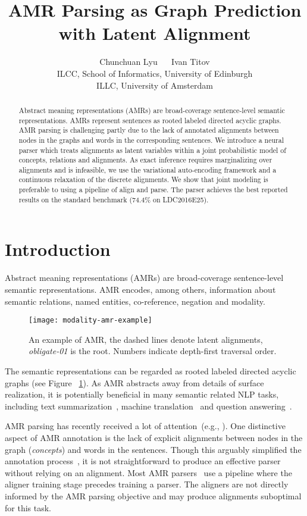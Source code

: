 \documentclass[11pt,a4paper]{article}
\title{AMR Parsing as Graph Prediction with Latent Alignment}
\author{
Chunchuan Lyu ~~  Ivan Titov \\
ILCC, School of Informatics, University of Edinburgh \\
ILLC, University of Amsterdam \\ 
}
\date{}
\begin{document}
\maketitle
\begin{abstract}
Abstract meaning representations (AMRs) are broad-coverage sentence-level semantic representations. AMRs represent sentences as rooted labeled directed acyclic graphs. AMR parsing is challenging partly due to the lack of annotated alignments between
nodes in the graphs and words in the corresponding sentences.
We introduce a neural parser which treats alignments as latent variables within a joint probabilistic model of concepts, relations and alignments. 
As exact inference requires marginalizing over alignments and 
is infeasible, we use the variational auto-encoding framework and a continuous relaxation of the discrete alignments.
We show that joint modeling 
is preferable to using a pipeline of align and parse. 
The parser achieves the best reported results on the standard benchmark (74.4\% on LDC2016E25). 


\end{abstract}


\section{Introduction}

Abstract meaning representations (AMRs) \cite{Banarescu13abstractmeaning} are broad-coverage sentence-level semantic representations. 
AMR encodes, among others, information about semantic relations, named entities, co-reference, negation and modality.
\begin{figure}[ht!]
\centering
\texttt{[image: modality-amr-example]}
\vspace{-2ex}
\caption{An example of AMR, the dashed lines denote latent alignments, {\it obligate-01} is the root. Numbers indicate depth-first traversal order.}
\label{fig:amr-example}
\end{figure}
The semantic representations can be regarded as rooted labeled directed acyclic graphs (see Figure ~\ref{fig:amr-example}). As AMR abstracts away from details of surface realization, it is potentially beneficial in many semantic related NLP tasks, including text summarization~\cite{Liu2015TowardAS,dohare2017text}, machine translation~\cite{Jones2012SemanticsBasedMT} and question answering~\cite{AAAI1612345}. 

AMR parsing has recently received a lot of attention~(e.g., \cite{Flanigan_adiscriminative,Artzi2015BroadcoverageCS,konstas-EtAl:2017:Long}). One distinctive aspect of AMR annotation is the lack of explicit alignments between nodes in the graph ({\it concepts}) and words in the sentences. Though this arguably simplified the annotation process~\cite{Banarescu13abstractmeaning}, it is not straightforward to produce an effective parser without relying on an alignment. 
Most AMR parsers~\cite{Marco,jamr-16,werling2015robust,wang2017getting,foland-martin:2017:Long}
use a pipeline where the aligner training stage precedes training a parser.
The aligners are not directly informed by the AMR parsing objective and may produce alignments suboptimal for this task.
\end{document}
